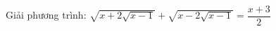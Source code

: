 \begin{baitap}
 Giải phương trình: $ \sqrt{x +2 \sqrt{x-1 } } + \sqrt{x -2 \sqrt{x-1 } } = \dfrac{x+3 }{2}  $
\begin{loigiai1}

\end{loigiai1}

\end{baitap}
